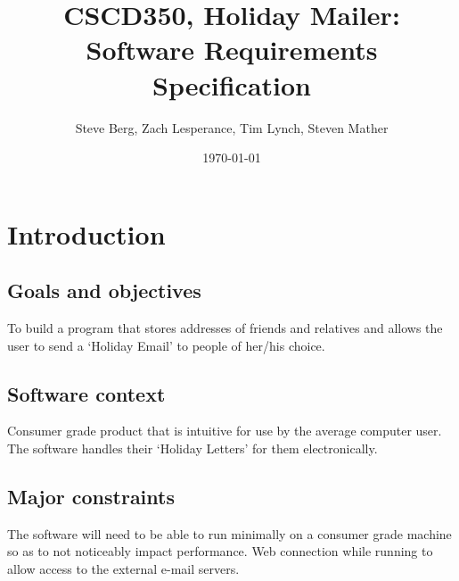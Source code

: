 \documentclass{article}
\title{CSCD350, Holiday Mailer: Software Requirements Specification}
\author{Steve Berg, Zach Lesperance, Tim Lynch, Steven Mather}
\date{\today}
\begin{document}
\maketitle{}
\pagebreak

\section{Introduction}

\subsection{Goals and objectives}
To build a program that stores addresses of friends and relatives and allows the user to send a `Holiday Email' to people of her/his choice.


\subsection{Software context}
Consumer grade product that is intuitive for use by the average computer user. The software handles their `Holiday Letters' for them electronically.

\subsection{Major constraints}
The software will need to be able to run minimally on a consumer grade machine so as to not noticeably impact performance.
Web connection while running to allow access to the external e-mail servers.

\end{document}
